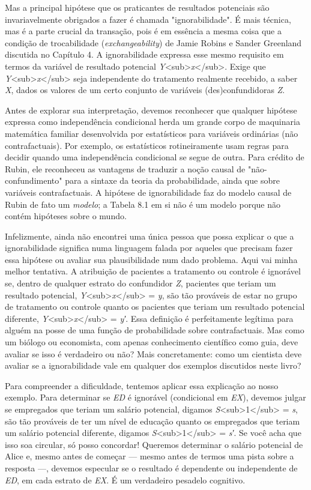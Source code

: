 \documentclass[11pt,a5paper,twoside]{book}
\begin{document}
Mas a principal hipótese que os praticantes de resultados potenciais são invariavelmente obrigados a fazer é chamada "ignorabilidade". É mais técnica, mas é a parte crucial da transação, pois é em essência a mesma coisa que a condição de trocabilidade (\textit{exchangeability}) de Jamie Robins e Sander Greenland discutida no Capítulo 4. A ignorabilidade expressa esse mesmo requisito em termos da variável de resultado potencial \textit{Y}<sub>\textit{x}</sub>. Exige que \textit{Y}<sub>\textit{x}</sub> seja independente do tratamento realmente recebido, a saber \textit{X}, dados os valores de um certo conjunto de variáveis (des)confundidoras \textit{Z}.

Antes de explorar sua interpretação, devemos reconhecer que qualquer hipótese expressa como independência condicional herda um grande corpo de maquinaria matemática familiar desenvolvida por estatísticos para variáveis ordinárias (não contrafactuais). Por exemplo, os estatísticos rotineiramente usam regras para decidir quando uma independência condicional se segue de outra. Para crédito de Rubin, ele reconheceu as vantagens de traduzir a noção causal de "não-confundimento" para a sintaxe da teoria da probabilidade, ainda que sobre variáveis contrafactuais. A hipótese de ignorabilidade faz do modelo causal de Rubin de fato um \textit{modelo}; a Tabela 8.1 em si não é um modelo porque não contém hipóteses sobre o mundo.

Infelizmente, ainda não encontrei uma única pessoa que possa explicar o que a ignorabilidade significa numa linguagem falada por aqueles que precisam fazer essa hipótese ou avaliar sua plausibilidade num dado problema. Aqui vai minha melhor tentativa. A atribuição de pacientes a tratamento ou controle é ignorável se, dentro de qualquer estrato do confundidor \textit{Z}, pacientes que teriam um resultado potencial, \textit{Y}<sub>\textit{x}</sub> = \textit{y}, são tão prováveis de estar no grupo de tratamento ou controle quanto os pacientes que teriam um resultado potencial diferente, \textit{Y}<sub>\textit{x}</sub> = \textit{y′}. Essa definição é perfeitamente legítima para alguém na posse de uma função de probabilidade sobre contrafactuais. Mas como um biólogo ou economista, com apenas conhecimento científico como guia, deve avaliar se isso é verdadeiro ou não? Mais concretamente: como um cientista deve avaliar se a ignorabilidade vale em qualquer dos exemplos discutidos neste livro?

Para compreender a dificuldade, tentemos aplicar essa explicação ao nosso exemplo. Para determinar se \textit{ED} é ignorável (condicional em \textit{EX}), devemos julgar se empregados que teriam um salário potencial, digamos \textit{S}<sub>1</sub> = \textit{s}, são tão prováveis de ter um nível de educação quanto os empregados que teriam um salário potencial diferente, digamos \textit{S}<sub>1</sub> = \textit{s′}. Se você acha que isso soa circular, só posso concordar! Queremos determinar o salário potencial de Alice e, mesmo antes de começar — mesmo antes de termos uma pista sobre a resposta —, devemos especular se o resultado é dependente ou independente de \textit{ED}, em cada estrato de \textit{EX}. É um verdadeiro pesadelo cognitivo.
\end{document}
